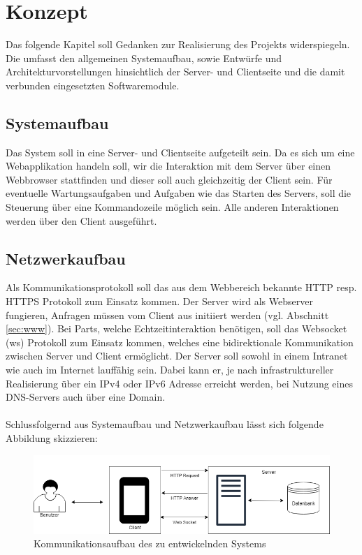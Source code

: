 \section{Konzept}\label{sec:konzept}
Das folgende Kapitel soll Gedanken zur Realisierung des Projekts widerspiegeln. 
Die umfasst den allgemeinen Systemaufbau, sowie Entwürfe und Architekturvorstellungen hinsichtlich der Server- und Clientseite und die damit verbunden eingesetzten Softwaremodule.
\subsection{Systemaufbau}\label{sec:sysaufbau}
Das System soll in eine Server- und Clientseite aufgeteilt sein. 
Da es sich um eine Webapplikation handeln soll, wir die Interaktion mit dem Server über einen Webbrowser stattfinden und dieser soll auch gleichzeitig der Client sein. Für eventuelle Wartungsaufgaben und Aufgaben wie das Starten des Servers, soll die Steuerung über eine Kommandozeile möglich sein. Alle anderen Interaktionen werden über den Client ausgeführt.
\subsection{Netzwerkaufbau}\label{sec:netzwerkaufbau}
Als Kommunikationsprotokoll soll das aus dem Webbereich bekannte HTTP resp. HTTPS Protokoll zum Einsatz kommen. Der Server wird als Webserver fungieren, Anfragen müssen vom Client aus initiiert werden (vgl. Abschnitt \ref{sec:www}). Bei Parts, welche Echtzeitinteraktion benötigen, soll das Websocket (ws) Protokoll zum Einsatz kommen, welches eine bidirektionale Kommunikation zwischen Server und Client ermöglicht. Der Server soll sowohl in einem Intranet wie auch im Internet lauffähig sein. Dabei kann er, je nach infrastruktureller Realisierung über ein IPv4 oder IPv6 Adresse erreicht werden, bei Nutzung eines DNS-Servers auch über eine Domain.\\ \\
Schlussfolgernd aus Systemaufbau und Netzwerkaufbau lässt sich folgende Abbildung skizzieren:

\begin{figure}[H]
	\centering
	\includegraphics[width=0.8\linewidth]{bilder/server_diagram}
	\caption[Kommunikationsaufbau des zu entwickelnden Systems]{Kommunikationsaufbau des zu entwickelnden Systems}
	\label{fig:server_diagram}
\end{figure}


